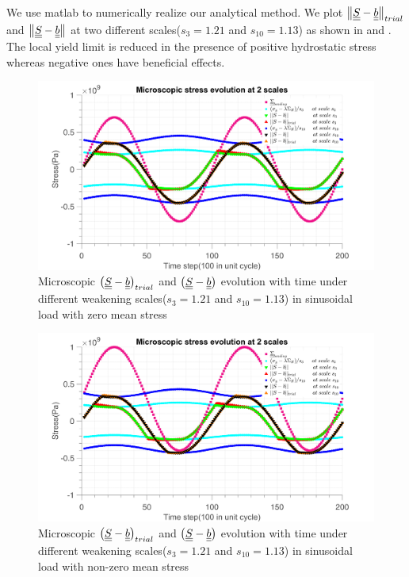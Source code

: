 We use matlab to numerically realize our analytical method. We plot $\left\|  \uline{\uline{S}}-\uline{\uline{b}}\right\|_{trial}$ and $\left\|  \uline{\uline{S}}-\uline{\uline{b}}\right\|$ at two different scales($s_{3}=1.21$ and $s_{10}=1.13$) as shown in  and . The local yield limit is reduced in the presence of positive hydrostatic stress whereas negative ones have beneficial effects.
\begin{figure}[!h]
\centering
\includegraphics[width=\textwidth]{figures//trialsin_0.png} 
\caption{Microscopic $\left(  \uline{\uline{S}}-\uline{\uline{b}}\right)_{trial}$ and $\left( \uline{\uline{S}}-\uline{\uline{b}}\right)$ evolution with time under different weakening scales($s_{3}=1.21$ and $s_{10}=1.13$) in sinusoidal load with zero mean stress}
\label{fig.trialsin0}
\end{figure}
\begin{figure}[!h]
\centering
\includegraphics[width=\textwidth]{figures//trialsin_m.png} 
\caption{Microscopic $\left(  \uline{\uline{S}}-\uline{\uline{b}}\right)_{trial}$ and $\left( \uline{\uline{S}}-\uline{\uline{b}}\right)$ evolution with time under different weakening scales($s_{3}=1.21$ and $s_{10}=1.13$) in sinusoidal load with non-zero mean stress}
\label{fig.trialsinm}
\end{figure}

